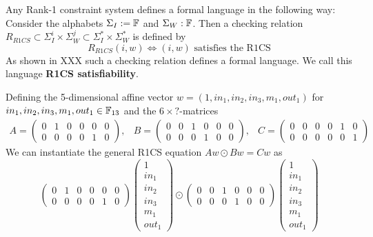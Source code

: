 \begin{remark} Any Rank-1 constraint system defines a formal language in the following way: Consider the alphabets $\Sigma_I:= \mathbb{F}$ and $\Sigma_W:\mathbb{F}$. Then a checking relation $R_{R1CS} \subset \Sigma_I^i \times \Sigma_W^j \subset \Sigma_I^* \times \Sigma_W^*$ is defined by 
$$
R_{R1CS}(i,w) \Leftrightarrow (i,w)\text{ satisfies the R1CS}
$$
As shown in XXX such a checking relation defines a formal language. We call this language \textbf{R1CS satisfiability}.
\end{remark}

\begin{example}
\label{main_example_2_4}
Defining the 5-dimensional affine vector $w =(1,in_1,in_2,in_3,m_1,out_1)$ for $in_1,in_2,in_3,m_1,out_1 \in \F_{13}$ and the $6\times ?$-matrices
$$
\begin{array}{lcr}
A = \begin{pmatrix}
0 & 1 & 0 & 0 & 0 & 0 \\ 
0 & 0 & 0 & 0 & 1 & 0
\end{pmatrix}, &
B = \begin{pmatrix}
0 & 0 & 1 & 0 & 0 & 0 \\ 
0 & 0 & 0 & 1 & 0 & 0
\end{pmatrix}, &
C = \begin{pmatrix}
0 & 0 & 0 & 0 & 1 & 0 \\ 
0 & 0 & 0 & 0 & 0 & 1
\end{pmatrix} 
\end{array}
$$
We can instantiate the general R1CS equation $Aw \odot Bw = Cw$ as
$$
\begin{pmatrix}
0 & 1 & 0 & 0 & 0 & 0 \\ 
0 & 0 & 0 & 0 & 1 & 0
\end{pmatrix} 
\begin{pmatrix}
1\\ in_1 \\ in_2 \\ in_3 \\ m_1 \\ out_1 
\end{pmatrix}\odot 
\begin{pmatrix}
0 & 0 & 1 & 0 & 0 & 0 \\ 
0 & 0 & 0 & 1 & 0 & 0
\end{pmatrix} 
\begin{pmatrix}
1\\ in_1 \\ in_2 \\ in_3 \\ m_1 \\ out_1 

\end{pmatrix}$$
\end{example}
